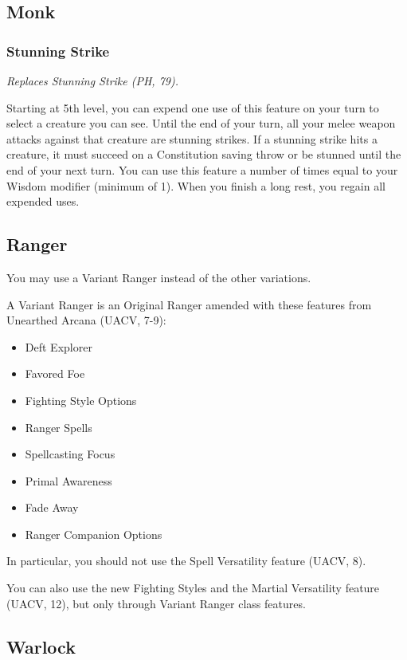 \documentclass[House_Rules.tex]{subfiles}
\begin{document}
\subsection{Monk}
\subsubsection{Stunning Strike}
\textit{Replaces Stunning Strike (PH, 79).}

Starting at 5th level, you can expend one use of this feature on your turn to select a creature you can see. Until the end of your turn, all your melee weapon attacks against that creature are stunning strikes. If a stunning strike hits a creature, it must succeed on a Constitution saving throw or be stunned until the end of your next turn. You can use this feature a number of times equal to your Wisdom modifier (minimum of 1). When you finish a long rest, you regain all expended uses.

\subsection{Ranger}
You may use a Variant Ranger instead of the other variations.

A Variant Ranger is an Original Ranger amended with these features from Unearthed Arcana (UACV, 7-9):

\begin{itemize}
    \item Deft Explorer
    \item Favored Foe
    \item Fighting Style Options
    \item Ranger Spells
    \item Spellcasting Focus
    \item Primal Awareness
    \item Fade Away
    \item Ranger Companion Options
\end{itemize}

In particular, you should not use the Spell Versatility feature (UACV, 8).

You can also use the new Fighting Styles and the Martial Versatility feature (UACV, 12), but only through Variant Ranger class features.

\subsection{Warlock}
\end{document}
